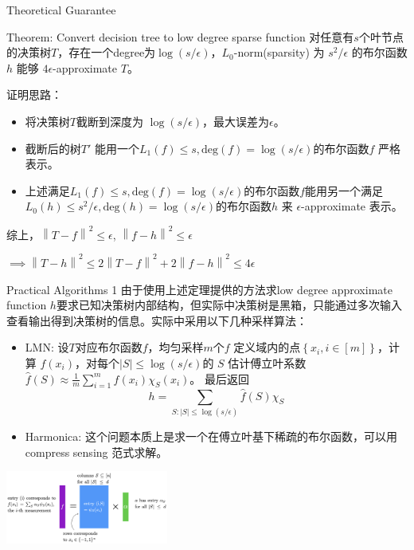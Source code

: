 \begin{frame}{Theoretical Guarantee}
    \begin{block}{Theorem: Convert decision tree to low degree sparse function}
        对任意有$s$个叶节点的决策树$T$，存在一个degree为$\log(s / \epsilon)$，$L_0$-norm(sparsity) 为 $s^{2} / \epsilon$ 的布尔函数 $h$ 能够 $4 \epsilon$-approximate $T$。 
    \end{block}
    证明思路：
    \begin{itemize}
        \item 将决策树$T$截断到深度为 $\log(s / \epsilon)$，最大误差为$\epsilon$。
        \item 截断后的树$T'$ 能用一个$L_1(f) \leqslant s, \text{deg}(f) = \log(s / \epsilon)$的布尔函数$f$ 严格表示。
        \item 上述满足$L_1(f) \leqslant s, \text{deg}(f) = \log(s / \epsilon)$的布尔函数$f$能用另一个满足$L_0(h) \leqslant s^{2} / \epsilon, \text{deg}(h) = \log (s / \epsilon)$的布尔函数$h$ 来 $\epsilon$-approximate 表示。
    \end{itemize}
    综上，$\left\| T-f \right\|^{2} \leqslant \epsilon$, $\left\| f-h \right\|^{2} \leqslant \epsilon$ 
    
    $\implies \left\| T - h \right\|^{2} \leqslant 2 \left\| T-f \right\|^{2} + 2 \left\| f-h \right\|^{2} \leqslant 4\epsilon$
\end{frame}

\begin{frame}{Practical Algorithms 1}
    由于使用上述定理提供的方法求low degree approximate function $h$要求已知决策树内部结构，但实际中决策树是黑箱，只能通过多次输入查看输出得到决策树的信息。实际中采用以下几种采样算法：
    \begin{itemize}
        \item LMN: 设$T$对应布尔函数$f$，均匀采样$m$个$f$ 定义域内的点$\left\{ x_i, i \in [m] \right\} $，计算 $f(x_i)$，对每个$|S| \leqslant \log(s / \epsilon)$的 $S$ 估计傅立叶系数$\hat{f}(S)\approx \frac{1}{m} \sum_{i=1}^{m} f(x_i) \chi _S(x_i)$。
        最后返回
        \[
            h = \sum_{S: |S| \leqslant \log(s / \epsilon)} \hat{f}(S) \chi _S
        \]
        \item Harmonica: 这个问题本质上是求一个在傅立叶基下稀疏的布尔函数，可以用compress sensing 范式求解。
    \end{itemize}
    \begin{center}
        \includegraphics[width=0.4\textwidth]{assets/harmonica.png}
    \end{center}

\end{frame}

